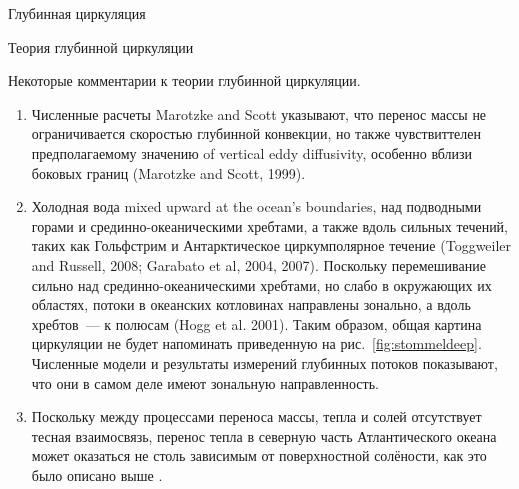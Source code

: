 \begin{chapter}{Глубинная циркуляция}
\begin{section}{Теория глубинной циркуляции}
\begin{paragraph}{Некоторые комментарии к теории глубинной циркуляции.}
\begin{enumerate}
\item 
Численные расчеты Marotzke and Scott указывают, что перенос 
массы не ограничивается скоростью глубинной конвекции,
но также чувствиттелен предполагаемому значению of vertical
eddy diffusivity, особенно вблизи боковых границ (Marotzke and Scott, 1999).
%

\item 
Холодная вода mixed upward at the ocean's boundaries, над подводными горами%
 и срединно-океаническими хребтами,
а также вдоль сильных течений, таких как Гольфстрим%
 и Антарктическое циркумполярное
течение (Toggweiler and Russell, 2008; Garabato et al, 2004, 2007). 
Поскольку перемешивание сильно над срединно-океаническими хребтами, но слабо
в окружающих их областях, потоки в океанских котловинах направлены зонально,
а вдоль хребтов~--- к полюсам (Hogg et al. 2001). Таким образом, общая картина
циркуляции не будет напоминать приведенную на рис.~\ref{fig:stommeldeep}. 
Численные модели и результаты
измерений глубинных потоков показывают, что они в самом деле имеют
зональную направленность.
%

\item 
Поскольку между процессами переноса массы, тепла и солей отсутствует тесная
взаимосвязь, перенос тепла в северную часть Атлантического океана может
оказаться не столь зависимым от поверхностной солёности, как это было описано
выше%
.
%
\end{enumerate}
\end{paragraph}
\end{section}


\end{chapter}
